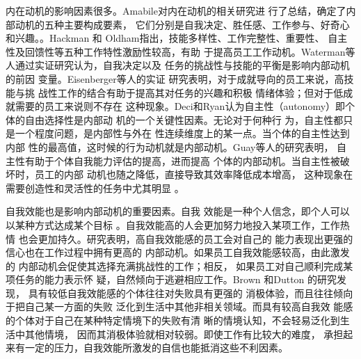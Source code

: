 \documentclass[12pt,a4paper,cs4size]{ctexart}
\begin{document}
内在动机的影响因素很多。Amabile对内在动机的相关研究进
行了总结，确定了内部动机的五种主要构成要素，
它们分别是自我决定、胜任感、工作参与、好奇心
和兴趣\cite{amabile1996cc}。。Hackman 和
Oldham指出，技能多样性、工作完整性、重要性、
自主性及回馈性等五种工作特性激励性较高，有助
于提高员工工作动机\cite{hackman1975djd}。Waterman等人通过实证研究认为，自我决定以及
任务的挑战性与技能的平衡是影响内部动机的前因
变量\cite{AlanSWaterman11012003}。Eisenberger等人的实证
研究表明，对于成就导向的员工来说，高技能与挑
战性工作的结合有助于提高其对任务的兴趣和积极
情绪体验；但对于低成就需要的员工来说则不存在
这种现象\cite{Eisenberger2005}。Deci和Ryan认为自主性（autonomy）即个体的自由选择性是内部动
机的一个关键性因素。无论对于何种行
为，自主性都只是一个程度问题，是内部性与外在
性连续维度上的某一点。当个体的自主性达到内部
性的最高值，这时候的行为动机就是内部动机\cite{ryan2000sdt}。Guay等人的研究表明，
自主性有助于个体自我能力评估的提高，进而提高
个体的内部动机。当自主性被破坏时，员工的内部
动机也随之降低，直接导致其效率降低成本增高，
这种现象在需要创造性和灵活性的任务中尤其明显
\cite{FredericGuay06012001}。

自我效能也是影响内部动机的重要因素。自我
效能是一种个人信念，即个人可以以某种方式达成某个目标
\cite{ormrod2003epd}。自我效能高的人会更加努力地投入某项工作，工作热情
也会更加持久\cite{schunk1990gsa}。研究表明，高自我效能感的员工会对自己的
能力表现出更强的信心也在工作过程中拥有更高的
内部动机。如果员工自我效能感较高，由此激发的
内部动机会促使其选择充满挑战性的工作；相反，
如果员工对自己顺利完成某项任务的能力表示怀
疑，自然倾向于逃避相应工作\cite{David2007}\cite{bandura2003nse}。Brown 和Dutton 的研究发现，
具有较低自我效能感的个体往往对失败具有更强的
消极体验，而且往往倾向于把自己某一方面的失败
泛化到生活中其他非相关领域。而具有较高自我效
能感的个体对于自己在某种特定情境下的失败有清
晰的情境认知，不会轻易泛化到生活中其他情境，
因而其消极体验就相对较弱\cite{brown1995tvc}。即使工作有比较大的难度，
承担起来有一定的压力，自我效能所激发的自信也能抵消这些不利因素。
\end{document}
